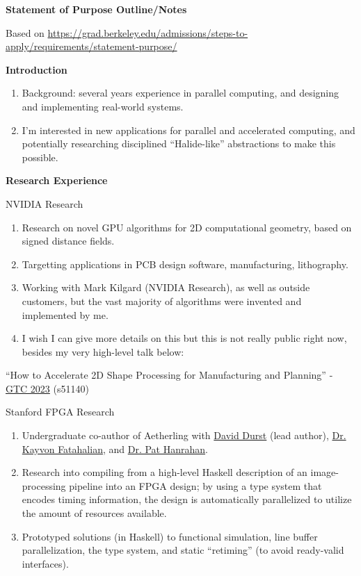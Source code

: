 \documentclass[11pt]{article}
\newcommand{\web}[1]{{\color{webColor} \small \url{#1}}}
\newcommand{\webText}[2]{{\color{webColor} \href{#1}{#2}}}
\newcommand{\myTitle}[1]{{ \vspace{2mm} \large \color{titleColor} \hspace{-12mm} \textbf{\textsf{#1}} \vspace{2mm}}}
\newcommand{\mySub}[1]{{\color{subColor}\hspace{-6mm} \textsf{#1}}}
\begin{document}
\raggedright
\reversemarginpar
\begin{center}
\textsf{\textbf{Statement of Purpose Outline/Notes}}
\end{center}

Based on \web{https://grad.berkeley.edu/admissions/steps-to-apply/requirements/statement-purpose/}

\myTitle{Introduction}

\begin{enumerate}
\item Background: several years experience in parallel computing, and
  designing and implementing real-world systems.
\item I'm interested in new applications for parallel and accelerated
  computing, and potentially researching disciplined ``Halide-like''
  abstractions to make this possible.
\end{enumerate}

\myTitle{Research Experience}

\mySub{NVIDIA Research}

\begin{enumerate}
\item Research on novel GPU algorithms for 2D computational geometry,
  based on signed distance fields.
\item Targetting applications in PCB design software, manufacturing, lithography.
\item Working with Mark Kilgard (NVIDIA Research), as well as outside
  customers, but the vast majority of algorithms were invented and
  implemented by me.
\item I wish I can give more details on this but this is not really
  public right now, besides my very high-level talk below:
\end{enumerate}

``How to Accelerate 2D Shape Processing for Manufacturing and Planning''
- \webText{https://www.nvidia.com/en-us/on-demand/session/gtcspring23-s51140/}{GTC 2023}
(s51140)
\filbreak

\mySub{Stanford FPGA Research}

\begin{enumerate}
\item Undergraduate co-author of Aetherling with
  \webText{https://david-durst.github.io/}{David Durst} (lead author),
  \webText{https://graphics.stanford.edu/~kayvonf/}{Dr. Kayvon Fatahalian},
  and \webText{https://graphics.stanford.edu/~hanrahan/}{Dr. Pat Hanrahan}.
\item Research into compiling from a high-level Haskell description of
  an image-processing pipeline into an FPGA design; by using a type
  system that encodes timing information, the design is automatically
  parallelized to utilize the amount of resources available.
\item Prototyped solutions (in Haskell) to functional simulation, line
  buffer parallelization, the type system, and static ``retiming'' (to
  avoid ready-valid interfaces).
\end{enumerate}
\end{document}
